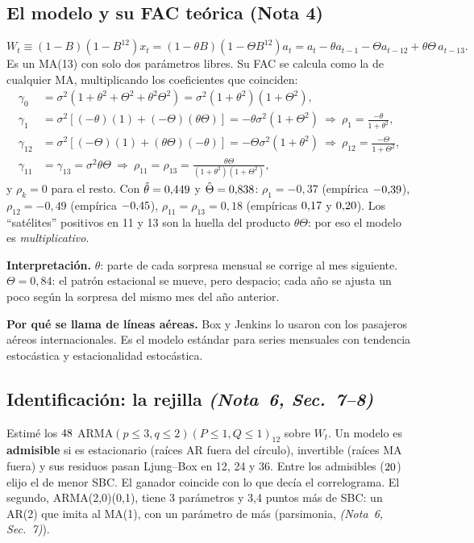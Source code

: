 \documentclass[11pt,a4paper]{article}
\newcommand{\nota}[2]{\textit{(Nota~#1, Sec.~#2)}}
\begin{document}
\subsection{El modelo y su FAC te\'orica (Nota 4)}
\[
W_t\equiv(1-B)(1-B^{12})x_t=(1-\theta B)(1-\Theta B^{12})a_t=a_t-\theta a_{t-1}-\Theta a_{t-12}+\theta\Theta\,a_{t-13}.
\]
Es un MA(13) con solo dos par\'ametros libres. Su FAC se calcula como la de cualquier MA, multiplicando los coeficientes que coinciden:
\begin{align*}
\gamma_0&=\sigma^2(1+\theta^2+\Theta^2+\theta^2\Theta^2)=\sigma^2(1+\theta^2)(1+\Theta^2),\\
\gamma_1&=\sigma^2[(-\theta)(1)+(-\Theta)(\theta\Theta)]=-\theta\sigma^2(1+\Theta^2)\ \Rightarrow\ \rho_1=\frac{-\theta}{1+\theta^2},\\
\gamma_{12}&=\sigma^2[(-\Theta)(1)+(\theta\Theta)(-\theta)]=-\Theta\sigma^2(1+\theta^2)\ \Rightarrow\ \rho_{12}=\frac{-\Theta}{1+\Theta^2},\\
\gamma_{11}&=\gamma_{13}=\sigma^2\theta\Theta\ \Rightarrow\ \rho_{11}=\rho_{13}=\frac{\theta\Theta}{(1+\theta^2)(1+\Theta^2)},
\end{align*}
y $\rho_k=0$ para el resto. Con $\hat\theta=0{,}449$ y $\hat\Theta=0{,}838$: $\rho_1=-0{,}37$ (emp\'irica $-0{,}39$), $\rho_{12}=-0{,}49$ (emp\'irica $-0{,}45$), $\rho_{11}=\rho_{13}=0{,}18$ (emp\'iricas $0{,}17$ y $0{,}20$). Los ``sat\'elites'' positivos en 11 y 13 son la huella del producto $\theta\Theta$: por eso el modelo es \emph{multiplicativo}.

\textbf{Interpretaci\'on.} $\theta$: parte de cada sorpresa mensual se corrige al mes siguiente. $\Theta=0{,}84$: el patr\'on estacional se mueve, pero despacio; cada a\~no se ajusta un poco seg\'un la sorpresa del mismo mes del a\~no anterior.

\textbf{Por qu\'e se llama de l\'ineas a\'ereas.} Box y Jenkins lo usaron con los pasajeros a\'ereos internacionales. Es el modelo est\'andar para series mensuales con tendencia estoc\'astica y estacionalidad estoc\'astica.

\subsection{Identificaci\'on: la rejilla \nota{6}{7--8}}
Estim\'e los $48$ ARMA$(p\le3,q\le2)(P\le1,Q\le1)_{12}$ sobre $W_t$. Un modelo es \textbf{admisible} si es estacionario (ra\'ices AR fuera del c\'irculo), invertible (ra\'ices MA fuera) y sus residuos pasan Ljung--Box en 12, 24 y 36. Entre los admisibles ($20$) elijo el de menor SBC. El ganador coincide con lo que dec\'ia el correlograma. El segundo, ARMA(2,0)(0,1), tiene 3 par\'ametros y 3,4 puntos m\'as de SBC: un AR(2) que imita al MA(1), con un par\'ametro de m\'as (parsimonia, \nota{6}{7}).
\end{document}
